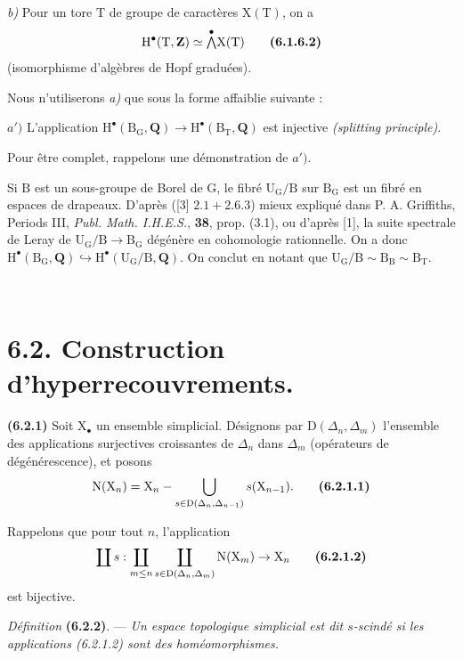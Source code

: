 \documentclass[11pt,leqno]{article}
\newcommand{\Page}[1]{\ifvmode\noindent\else\unskip\ \fi{\footnotesize\textcolor{gray}{[p.\,#1]}}\ \ignorespaces}
\begin{document}
\textit{b)} Pour un tore \(\mathrm{T}\) de groupe de caractères \(\mathrm{X}(\mathrm{T})\), on a
\[
\mathrm{H}^{\bullet}(\mathrm{T},\mathbf{Z})
\simeq\overset{\bullet}{\mathop{\textstyle\bigwedge}}\mathrm{X}(\mathrm{T})
\tag*{\textbf{(6.1.6.2)}}
\]
(isomorphisme d’algèbres de Hopf graduées).

Nous n’utiliserons \textit{a)} que sous la forme affaiblie suivante :

\(a')\) L’application \(\mathrm{H}^{\bullet}(\mathrm{B}_{\mathrm{G}},\mathbf{Q})\to\mathrm{H}^{\bullet}(\mathrm{B}_{\mathrm{T}},\mathbf{Q})\) est injective \textit{(splitting principle)}.

Pour être complet, rappelons une démonstration de \(a')\).

Si \(\mathrm{B}\) est un sous-groupe de Borel de \(\mathrm{G}\), le fibré \(\mathrm{U}_{\mathrm{G}}/\mathrm{B}\) sur \(\mathrm{B}_{\mathrm{G}}\) est un fibré en espaces de drapeaux. D’après ([3] \(2.1+2.6.3\)) mieux expliqué dans P. A. Griffiths, Periods III, \textit{Publ. Math. I.H.E.S.}, \textbf{38}, prop. (3.1), ou d’après [1], la suite spectrale de Leray de \(\mathrm{U}_{\mathrm{G}}/\mathrm{B}\to\mathrm{B}_{\mathrm{G}}\) dégénère en cohomologie rationnelle. On a donc \(\mathrm{H}^{\bullet}(\mathrm{B}_{\mathrm{G}},\mathbf{Q})\hookrightarrow\mathrm{H}^{\bullet}(\mathrm{U}_{\mathrm{G}}/\mathrm{B},\mathbf{Q})\). On conclut en notant que \(\mathrm{U}_{\mathrm{G}}/\mathrm{B}\sim\mathrm{B}_{\mathrm{B}}\sim\mathrm{B}_{\mathrm{T}}\).

\Page{19}
\section*{6.2. Construction d’hyperrecouvrements.}

\textbf{(6.2.1)} Soit \(\mathrm{X}_{\bullet}\) un ensemble simplicial. Désignons par \(\mathrm{D}(\Delta_n,\Delta_m)\) l’ensemble des applications surjectives croissantes de \(\Delta_n\) dans \(\Delta_m\) (opérateurs de dégénérescence), et posons
\[
\mathrm{N}(\mathrm{X}_n)
=\mathrm{X}_n-\bigcup_{s\in\mathrm{D}(\Delta_n,\Delta_{n-1})}
s(\mathrm{X}_{n-1}).
\tag*{\textbf{(6.2.1.1)}}
\]

Rappelons que pour tout \(n\), l’application
\[
\coprod s:
\coprod_{m\leq n}\coprod_{s\in\mathrm{D}(\Delta_n,\Delta_m)}
\mathrm{N}(\mathrm{X}_m)\to\mathrm{X}_n
\tag*{\textbf{(6.2.1.2)}}
\]
est bijective.

\textit{Définition} \textbf{(6.2.2)}. — \textit{Un espace topologique simplicial est dit \textup{\(s\)-scindé} si les applications \textup{(6.2.1.2)} sont des homéomorphismes.}
\end{document}
